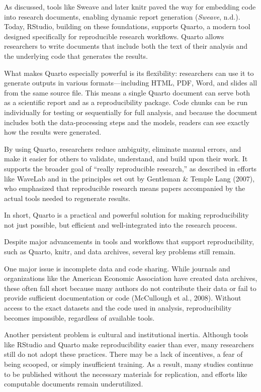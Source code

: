 \documentclass[
  british,
  a4paper,
]{article}
\begin{document}
As discussed, tools like Sweave and later knitr paved the way for
embedding code into research documents, enabling dynamic report
generation (\emph{Sweave}, n.d.). Today, RStudio, building on these
foundations, supports Quarto, a modern tool designed specifically for
reproducible research workflows. Quarto allows researchers to write
documents that include both the text of their analysis and the
underlying code that generates the results.

What makes Quarto especially powerful is its flexibility: researchers
can use it to generate outputs in various formats---including HTML, PDF,
Word, and slides all from the same source file. This means a single
Quarto document can serve both as a scientific report and as a
reproducibility package. Code chunks can be run individually for testing
or sequentially for full analysis, and because the document includes
both the data-processing steps and the models, readers can see exactly
how the results were generated.

By using Quarto, researchers reduce ambiguity, eliminate manual errors,
and make it easier for others to validate, understand, and build upon
their work. It supports the broader goal of ``really reproducible
research,'' as described in efforts like WaveLab and in the principles
set out by Gentleman \& Temple Lang (2007), who emphasized that
reproducible research means papers accompanied by the actual tools
needed to regenerate results.

In short, Quarto is a practical and powerful solution for making
reproducibility not just possible, but efficient and well-integrated
into the research process.

Despite major advancements in tools and workflows that support
reproducibility, such as Quarto, knitr, and data archives, several key
problems still remain.

One major issue is incomplete data and code sharing. While journals and
organizations like the American Economic Association have created data
archives, these often fall short because many authors do not contribute
their data or fail to provide sufficient documentation or code
(McCullough et al., 2008). Without access to the exact datasets and the
code used in analysis, reproducibility becomes impossible, regardless of
available tools.

Another persistent problem is cultural and institutional inertia.
Although tools like RStudio and Quarto make reproducibility easier than
ever, many researchers still do not adopt these practices. There may be
a lack of incentives, a fear of being scooped, or simply insufficient
training. As a result, many studies continue to be published without the
necessary materials for replication, and efforts like computable
documents remain underutilized.
\end{document}
